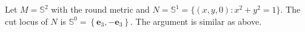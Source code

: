 \begin{eg}
    Let $M=\mathbb{S}^2$ with the round metric and $N=\mathbb{S}^1=\{(x,y,0):x^2+y^2=1\}$. The cut locus of $N$ is $\mathbb{S}^0=\left\{\mathbf{e}_3,-\mathbf{e}_3\right\}$. The argument is similar as above.
\end{eg}


